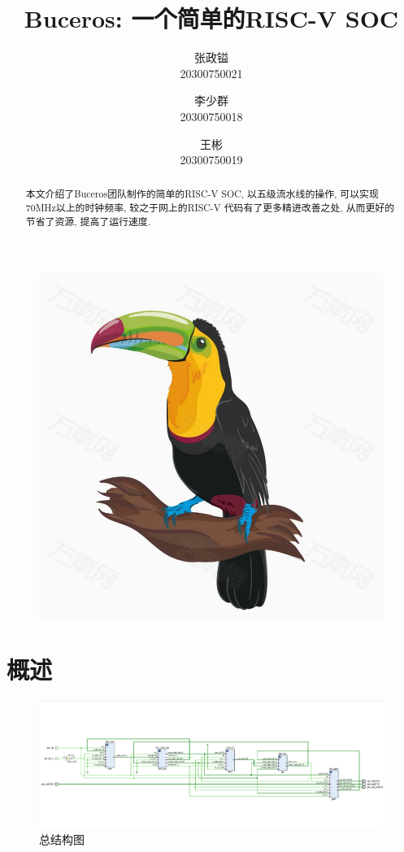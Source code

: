 \documentclass[lang=cn,11pt,a4paper,chinesefont=founder]{elegantpaper}
\title{Buceros: 一个简单的RISC-V SOC}
\author{张政镒 \\ 20300750021 \and 李少群 \\ 20300750018 \and 王彬 \\ 20300750019}
\institute{\href{https://github.com/0xtaruhi/Buceros}{Github项目链接}}
\date{\zhtoday}
\begin{document}
\maketitle
\begin{figure}[h]
    \centering
    \includegraphics[scale=0.1]{buceros}
\end{figure}
\begin{abstract}
    本文介绍了Buceros团队制作的简单的RISC-V SOC, 以五级流水线的操作, 可以实现70MHz以上的时钟频率, 较之于网上的RISC-V 代码有了更多精进改善之处, 从而更好的节省了资源, 提高了运行速度. 
\end{abstract}


\section{概述}
\begin{figure}[h]
    \centering
    \includegraphics[scale=0.4]{总结构图}
    \caption{总结构图}
\end{figure}
\end{document}
